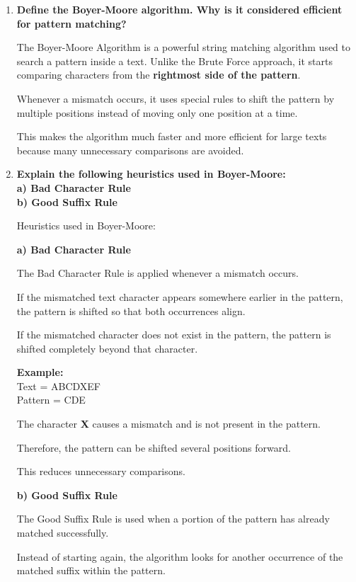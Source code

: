 
\begin{enumerate}[label=\textbf{\Alph*.}]

\item \textbf{Define the Boyer-Moore algorithm. Why is it considered efficient for pattern
matching?}

The Boyer-Moore Algorithm is a powerful string matching algorithm used to search a pattern
inside a text. Unlike the Brute Force approach, it starts comparing characters from the
\textbf{rightmost side of the pattern}.

Whenever a mismatch occurs, it uses special rules to shift the pattern by multiple
positions instead of moving only one position at a time.

This makes the algorithm much faster and more efficient for large texts because many
unnecessary comparisons are avoided.

\item \textbf{Explain the following heuristics used in Boyer-Moore:\\
a) Bad Character Rule\\
b) Good Suffix Rule}

Heuristics used in Boyer-Moore:

\textbf{a) Bad Character Rule}

The Bad Character Rule is applied whenever a mismatch occurs.

If the mismatched text character appears somewhere earlier in the pattern,
the pattern is shifted so that both occurrences align.

If the mismatched character does not exist in the pattern,
the pattern is shifted completely beyond that character.

\textbf{Example:}\\
Text = ABCDXEF\\
Pattern = CDE

The character \textbf{X} causes a mismatch and is not present in the pattern.

Therefore, the pattern can be shifted several positions forward.

This reduces unnecessary comparisons.

\textbf{b) Good Suffix Rule}

The Good Suffix Rule is used when a portion of the pattern has already matched
successfully.

Instead of starting again, the algorithm looks for another occurrence of the
matched suffix within the pattern.


\end{enumerate}
